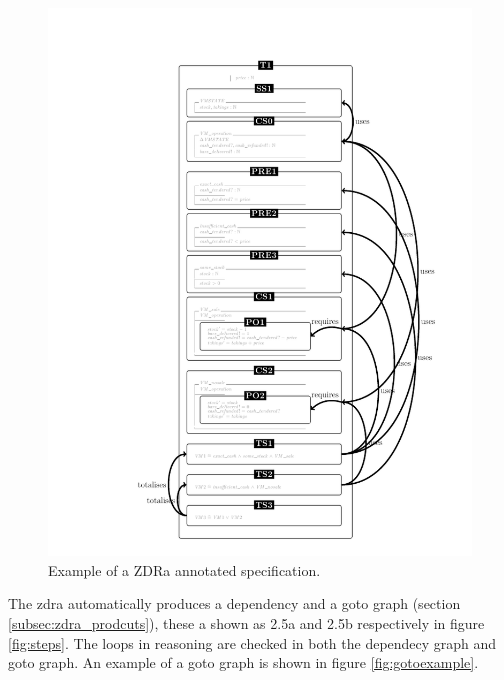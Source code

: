 \begin{figure}[H]
 \begin{center}
 \includegraphics [scale=0.2]{Figures/Design/zdracomp.png}
 \caption{Example of a ZDRa annotated specification.}
 \label{fig:zdraexample}
\end{center}
\end{figure} 

The \gls{zdra} automatically produces a dependency and a goto graph (section \ref{subsec:zdra_prodcuts}), these a shown as 2.5a and 2.5b respectively in figure \ref{fig:steps}. The loops in reasoning are checked in both the dependecy graph and goto graph. An example of a goto graph is shown in figure \ref{fig:gotoexample}.

